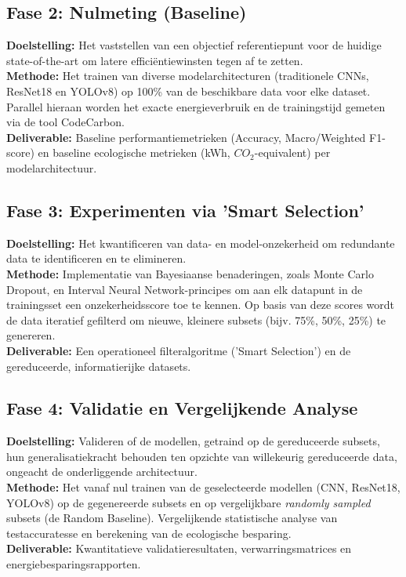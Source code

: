 \subsection{Fase 2: Nulmeting (Baseline)}
\textbf{Doelstelling:} Het vaststellen van een objectief referentiepunt voor de huidige state-of-the-art om latere efficiëntiewinsten tegen af te zetten. \\
\textbf{Methode:} Het trainen van diverse modelarchitecturen (traditionele CNNs, ResNet18 en YOLOv8) op 100\% van de beschikbare data voor elke dataset. Parallel hieraan worden het exacte energieverbruik en de trainingstijd gemeten via de tool CodeCarbon. \\
\textbf{Deliverable:} Baseline performantiemetrieken (Accuracy, Macro/Weighted F1-score) en baseline ecologische metrieken (kWh, $CO_2$-equivalent) per modelarchitectuur.

\subsection{Fase 3: Experimenten via 'Smart Selection'}
\textbf{Doelstelling:} Het kwantificeren van data- en model-onzekerheid om redundante data te identificeren en te elimineren. \\
\textbf{Methode:} Implementatie van Bayesiaanse benaderingen, zoals Monte Carlo Dropout, en Interval Neural Network-principes om aan elk datapunt in de trainingsset een onzekerheidsscore toe te kennen. Op basis van deze scores wordt de data iteratief gefilterd om nieuwe, kleinere subsets (bijv. 75\%, 50\%, 25\%) te genereren. \\
\textbf{Deliverable:} Een operationeel filteralgoritme ('Smart Selection') en de gereduceerde, informatierijke datasets.

\subsection{Fase 4: Validatie en Vergelijkende Analyse}
\textbf{Doelstelling:} Valideren of de modellen, getraind op de gereduceerde subsets, hun generalisatiekracht behouden ten opzichte van willekeurig gereduceerde data, ongeacht de onderliggende architectuur. \\
\textbf{Methode:} Het vanaf nul trainen van de geselecteerde modellen (CNN, ResNet18, YOLOv8) op de gegenereerde subsets en op vergelijkbare \textit{randomly sampled} subsets (de Random Baseline). Vergelijkende statistische analyse van testaccuratesse en berekening van de ecologische besparing. \\
\textbf{Deliverable:} Kwantitatieve validatieresultaten, verwarringsmatrices en energiebesparingsrapporten.

